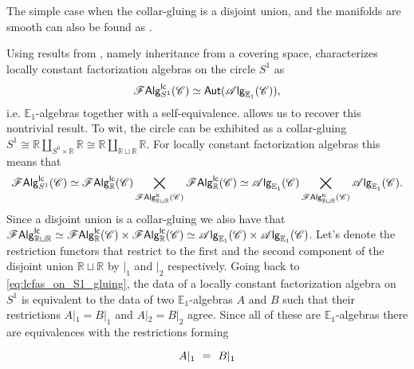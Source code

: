 \documentclass[../text]{subfiles}
\begin{document}
\begin{remark}
    The simple case when the collar-gluing is a disjoint union, and the manifolds are smooth can also be found as \cite[ex.5.4.5.4]{lurie_ha}.
\end{remark}

\begin{example}\label{ex:reproduce_lcfas_on_S1}
    Using results from \cite[prop.4.0.1]{cg2016}, namely inheritance from a covering space, \cite[sec.5.5]{ginot2015} characterizes locally constant factorization algebras on the circle $S^1$ as
    \begin{equation}
        \mathscr{F} \mathsf{Alg}^{\mathsf{lc}}_{S^1} (\mathscr{C}) \simeq \mathsf{Aut} (\mathscr{A} \mathsf{lg}_{\mathbb{E}_1} (\mathscr{C})),
    \end{equation}
    i.e. $\mathbb{E}_1$-algebras together with a self-equivalence.  allows us to recover this nontrivial result. To wit, the circle can be exhibited as a collar-gluing $S^1 \cong \mathbb{R} \coprod_{S^0 \times \mathbb{R}} \mathbb{R} \cong \mathbb{R} \coprod_{\mathbb{R} \sqcup \mathbb{R}} \mathbb{R}$. For locally constant factorization algebras this means that
    \begin{equation}\label{eq:lcfas_on_S1_gluing}
        \mathscr{F} \mathsf{Alg}^{\mathsf{lc}}_{S^1} (\mathscr{C}) \simeq \mathscr{F} \mathsf{Alg}^{\mathsf{lc}}_{\mathbb{R}} (\mathscr{C}) \bigtimes_{\mathscr{F} \mathsf{Alg}^{\mathsf{lc}}_{\mathbb{R} \sqcup \mathbb{R}} (\mathscr{C})} \mathscr{F} \mathsf{Alg}^{\mathsf{lc}}_{\mathbb{R}} (\mathscr{C}) \simeq \mathscr{A} \mathsf{lg}_{\mathbb{E}_1} (\mathscr{C}) \bigtimes_{\mathscr{F} \mathsf{Alg}^{\mathsf{lc}}_{\mathbb{R} \sqcup \mathbb{R}} (\mathscr{C})} \mathscr{A} \mathsf{lg}_{\mathbb{E}_1} (\mathscr{C}).
    \end{equation}
    Since a disjoint union is a collar-gluing we also have that $\mathscr{F} \mathsf{Alg}^{\mathsf{lc}}_{\mathbb{R} \sqcup \mathbb{R}} \simeq \mathscr{F} \mathsf{Alg}^{\mathsf{lc}}_{\mathbb{R}} (\mathscr{C}) \times \mathscr{F} \mathsf{Alg}^{\mathsf{lc}}_{\mathbb{R}} (\mathscr{C}) \simeq \mathscr{A} \mathsf{lg}_{\mathbb{E}_1} (\mathscr{C}) \times \mathscr{A} \mathsf{lg}_{\mathbb{E}_1} (\mathscr{C})$. Let's denote the restriction functors that restrict to the first and the second component of the disjoint union $\mathbb{R} \sqcup \mathbb{R}$ by $|_1$ and $|_2$ respectively. Going back to \cref{eq:lcfas_on_S1_gluing}, the data of a locally constant factorization algebra on $S^1$ is equivalent to the data of two $\mathbb{E}_1$-algebras $A$ and $B$ such that their restrictions $A|_1 = B|_1$ and $A|_2 = B|_2$ agree. Since all of these are $\mathbb{E}_1$-algebras there are equivalences with the restrictions forming
    \begin{equation}
        \begin{tikzcd}[row sep = small, column sep= small]
            & A|_1 \arrow[r, phantom, "=", description] & B|_1 & \\

\end{tikzcd}
\end{equation}
\end{example}
\end{document}

